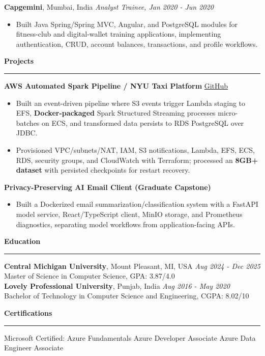 \documentclass[11pt,letterpaper]{article}
\newcommand{\ressection}[1]{\Needspace{6\baselineskip}\vspace{8pt}\par\textbf{#1}\par\vspace{2pt}\hrule\vspace{5pt}}
\begin{document}
\textbf{Capgemini}, Mumbai, India \hfill \textit{Analyst Trainee, Jan 2020 - Jun 2020}
\begin{itemize}
  \item Built Java Spring/Spring MVC, Angular, and PostgreSQL modules for fitness-club and digital-wallet training applications, implementing authentication, CRUD, account balances, transactions, and profile workflows.
\end{itemize}

\ressection{Projects}
\textbf{AWS Automated Spark Pipeline / NYU Taxi Platform} \hfill \href{https://github.com/preferablehuman/AWS-automated-spark-pipeline}{GitHub}
\begin{itemize}
  \item Built an event-driven pipeline where S3 events trigger Lambda staging to EFS, \textbf{Docker-packaged} Spark Structured Streaming processes micro-batches on ECS, and transformed data persists to RDS PostgreSQL over JDBC.
  \item Provisioned VPC/subnets/NAT, IAM, S3 notifications, Lambda, EFS, ECS, RDS, security groups, and CloudWatch with Terraform; processed an \textbf{8GB+ dataset} with persisted checkpoints for restart recovery.
\end{itemize}
\vspace{2pt}
\textbf{Privacy-Preserving AI Email Client (Graduate Capstone)}
\begin{itemize}
  \item Built a Dockerized email summarization/classification system with a FastAPI model service, React/TypeScript client, MinIO storage, and Prometheus diagnostics, separating model workflows from application-facing APIs.
\end{itemize}

\ressection{Education}
\textbf{Central Michigan University}, Mount Pleasant, MI, USA \hfill \textit{Aug 2024 - Dec 2025}\\
Master of Science in Computer Science, GPA: 3.87/4.0\\
\textbf{Lovely Professional University}, Punjab, India \hfill \textit{Aug 2016 - May 2020}\\
Bachelor of Technology in Computer Science and Engineering, CGPA: 8.02/10

\ressection{Certifications}
Microsoft Certified: Azure Fundamentals \textbar{} Azure Developer Associate \textbar{} Azure Data Engineer Associate
\end{document}
